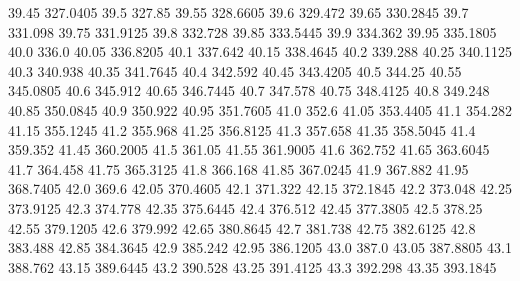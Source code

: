           39.45         327.0405
           39.5           327.85
          39.55         328.6605
           39.6          329.472
          39.65         330.2845
           39.7          331.098
          39.75         331.9125
           39.8          332.728
          39.85         333.5445
           39.9          334.362
          39.95         335.1805
           40.0            336.0
          40.05         336.8205
           40.1          337.642
          40.15         338.4645
           40.2          339.288
          40.25         340.1125
           40.3          340.938
          40.35         341.7645
           40.4          342.592
          40.45         343.4205
           40.5           344.25
          40.55         345.0805
           40.6          345.912
          40.65         346.7445
           40.7          347.578
          40.75         348.4125
           40.8          349.248
          40.85         350.0845
           40.9          350.922
          40.95         351.7605
           41.0            352.6
          41.05         353.4405
           41.1          354.282
          41.15         355.1245
           41.2          355.968
          41.25         356.8125
           41.3          357.658
          41.35         358.5045
           41.4          359.352
          41.45         360.2005
           41.5           361.05
          41.55         361.9005
           41.6          362.752
          41.65         363.6045
           41.7          364.458
          41.75         365.3125
           41.8          366.168
          41.85         367.0245
           41.9          367.882
          41.95         368.7405
           42.0            369.6
          42.05         370.4605
           42.1          371.322
          42.15         372.1845
           42.2          373.048
          42.25         373.9125
           42.3          374.778
          42.35         375.6445
           42.4          376.512
          42.45         377.3805
           42.5           378.25
          42.55         379.1205
           42.6          379.992
          42.65         380.8645
           42.7          381.738
          42.75         382.6125
           42.8          383.488
          42.85         384.3645
           42.9          385.242
          42.95         386.1205
           43.0            387.0
          43.05         387.8805
           43.1          388.762
          43.15         389.6445
           43.2          390.528
          43.25         391.4125
           43.3          392.298
          43.35         393.1845
